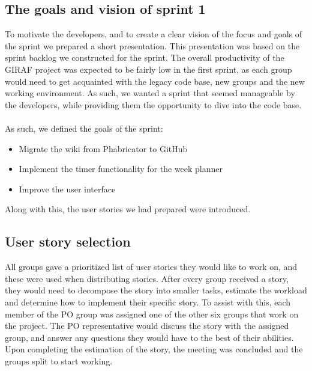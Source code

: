 \subsection{The goals and vision of sprint 1}
To motivate the developers, and to create a clear vision of the focus and goals of the sprint we prepared a short presentation.
This presentation was based on the sprint backlog we constructed for the sprint.
The overall productivity of the GIRAF project was expected to be fairly low in the first sprint, as each group would need to get acquainted with the legacy code base, new groups and the new working environment.
As such, we wanted a sprint that seemed manageable by the developers, while providing them the opportunity to dive into the code base.
\\\\
As such, we defined the goals of the sprint:
\begin{itemize}
    \item Migrate the wiki from Phabricator to GitHub
    \item Implement the timer functionality for the week planner
    \item Improve the user interface
\end{itemize}
Along with this, the user stories we had prepared were introduced.

\subsection{User story selection}
All groups gave a prioritized list of user stories they would like to work on, and these were used when distributing stories.
After every group received a story, they would need to decompose the story into smaller tasks, estimate the workload and determine how to implement their specific story.
To assist with this, each member of the PO group was assigned one of the other six groups that work on the project. 
The PO representative would discuss the story with the assigned group, and answer any questions they would have to the best of their abilities.
Upon completing the estimation of the story, the meeting was concluded and the groups split to start working.

